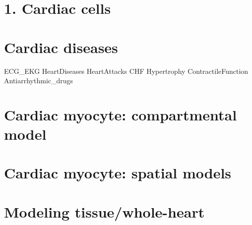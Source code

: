 \documentclass[11pt]{book}
\begin{document}
\part{1. Cardiac cells}
\label{part:cardiac_cells}





\part{Cardiac diseases}

{ECG_EKG}
{HeartDiseases}
{HeartAttacks}
{CHF}
{Hypertrophy}
{ContractileFunction}
{Antiarrhythmic_drugs}

\part{Cardiac myocyte: compartmental model}
\label{part:compartmental_model}











\part{Cardiac myocyte: spatial models}
\label{part:spatial_modeling}




%

%

\part{Modeling tissue/whole-heart}
\label{part:whole-heart}




%



\end{document}
